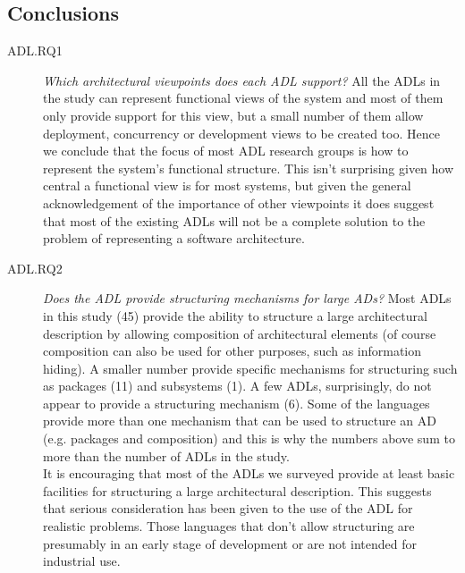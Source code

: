 \subsection{Conclusions}

\begin{description}
\item[ADL.RQ1] \emph{Which architectural viewpoints does each ADL support?}
All the ADLs in the study can represent functional views of the system and most of them only provide support for this view, but a small number of them allow deployment, concurrency or development views to be created too. Hence we conclude that the focus of most ADL research groups is how to represent the system's functional structure. This isn't surprising given how central a functional view is for most systems, but given the general acknowledgement of the importance of other viewpoints \cite{bachmann2011-documenting, brown2018-sad, kruchten1995-4plus1, rozanski2011-ssa2e} it does suggest that most of the existing ADLs will not be a complete solution to the problem of representing a software architecture.

\item[ADL.RQ2] \emph{Does the ADL provide structuring mechanisms for large ADs?}
Most ADLs in this study (45) provide the ability to structure a large architectural description by allowing composition of architectural elements (of course composition can also be used for other purposes, such as information hiding).   A smaller number provide specific mechanisms for structuring such as packages (11) and subsystems (1).  A few ADLs, surprisingly, do not appear to provide a structuring mechanism (6).  Some of the languages provide more than one mechanism that can be used to structure an AD (e.g. packages and composition) and this is why the numbers above sum to more than the number of ADLs in the study.\\
It is encouraging that most of the ADLs we surveyed provide at least basic facilities for structuring a large architectural description. This suggests that serious consideration has been given to the use of the ADL for realistic problems.  Those languages that don't allow structuring are presumably in an early stage of development or are not intended for industrial use.


\end{description}
